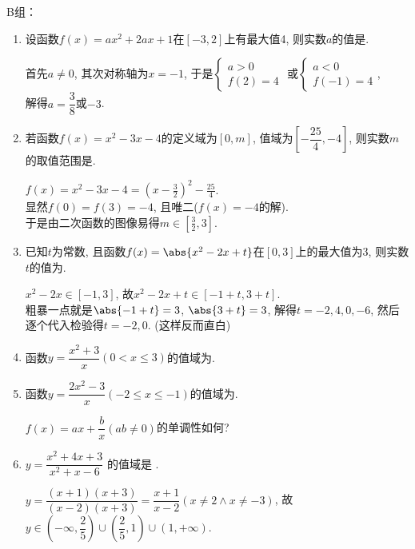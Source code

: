 B组：
\begin{enumerate}
\item 设函数$f(x)=ax^2+2ax+1$在$[-3,2]$上有最大值4, 则实数$a$的值是. 
\begin{jieda}
首先$a\neq 0$, 其次对称轴为$x=-1$, 于是$\begin{cases}
a>0\\
f(2)=4
\end{cases}$
或$\begin{cases}
a<0\\
f(-1)=4
\end{cases}$, \\
解得$a=\dfrac{3}{8}$或$-3$. 
\end{jieda}

\item 若函数$f(x)=x^2-3x-4$的定义域为$[0,m]$, 值域为$\left[-\dfrac{25}{4},-4\right]$, 则实数$m$的取值范围是\blkda{$[\frac{3}{2},3]$}. 
\begin{jieda}
$f(x)=x^2-3x-4=(x-\frac{3}{2})^2-\frac{25}{4}$. \\
显然$f(0)=f(3)=-4$, 且唯二($f(x)=-4$的解). \\
于是由二次函数的图像易得$m\in[\frac{3}{2},3]$. 
\end{jieda}

\item 已知$t$为常数, 且函数$f(x)=\abs{x^2-2x+t}$在$[0,3]$上的最大值为3, 则实数$t$的值为. 
\begin{jieda}
$x^2-2x\in[-1,3]$, 故$x^2-2x+t\in[-1+t,3+t]$. \\
粗暴一点就是$\abs{-1+t}=3$, $\abs{3+t}=3$, 解得$t=-2,4,0,-6$, 然后逐个代入检验得$t=-2,0$. (这样反而直白)
\end{jieda}

\item 函数$y=\dfrac{x^2+3}{x}(0<x\leq 3)$的值域为\blkda[2]{$[2\sqrt{3},+\infty)$}.

\item 函数$y=\dfrac{2x^2-3}{x}(-2\leq x\leq -1)$的值域为. 
\begin{jieda}
$f(x)=ax+\dfrac{b}{x}(ab\neq 0)$的单调性如何? 
\end{jieda}

\item $y=\dfrac{x^2+4x+3}{x^2+x-6}$ 的值域是 .
\begin{jieda}
$y=\dfrac{(x+1)(x+3)}{(x-2)(x+3)}=\dfrac{x+1}{x-2}(x\neq 2\land x\neq -3)$, 故$y\in(-\infty,\dfrac{2}{5})\cup(\dfrac{2}{5},1)\cup(1,+\infty)$. 


\end{jieda}
\end{enumerate}
